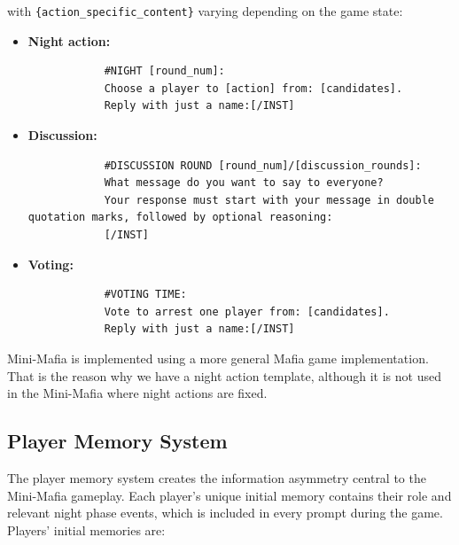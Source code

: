 \documentclass[sigconf]{aamas}
\begin{document}
with \texttt{\{action\_specific\_content\}} varying depending on the game state:

\begin{itemize}
    \item\textbf{Night action:}

    \begin{small}
        \begin{verbatim}
            #NIGHT [round_num]:
            Choose a player to [action] from: [candidates].
            Reply with just a name:[/INST]
        \end{verbatim}
    \end{small}

    \item\textbf{Discussion:}

    \begin{small}
        \begin{verbatim}
            #DISCUSSION ROUND [round_num]/[discussion_rounds]:
            What message do you want to say to everyone?
            Your response must start with your message in double quotation marks, followed by optional reasoning:
            [/INST]
        \end{verbatim}
    \end{small}

    \item\textbf{Voting:}

    \begin{small}
        \begin{verbatim}
            #VOTING TIME:
            Vote to arrest one player from: [candidates].
            Reply with just a name:[/INST]
        \end{verbatim}
    \end{small}
\end{itemize}
Mini-Mafia is implemented using a more general Mafia game implementation. That is the reason why we have a night action template, although it is not used in the Mini-Mafia where night actions are fixed.

\subsection{Player Memory System}
\label{appendix:memory}

The player memory system creates the information asymmetry central to the Mini-Mafia gameplay. Each player's unique initial memory contains their role and relevant night phase events, which is included in every prompt during the game. Players' initial memories are:
\end{document}

